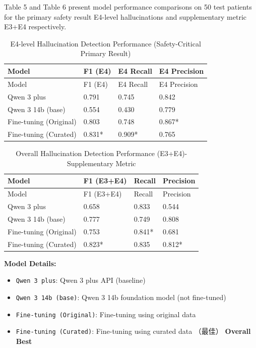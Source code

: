 \documentclass[11pt]{article}
\begin{document}
Table 5 and Table 6 present model performance comparisons on 50 test patients for the primary safety result E4-level hallucinations and supplementary metric E3+E4 respectively.

\begin{longtable}[]{@{}llll@{}}
\caption{E4-level Hallucination Detection Performance (Safety-Critical Primary Result)}\tabularnewline
\toprule\noalign{}
Model & F1 (E4) & E4 Recall & E4 Precision \\
\midrule\noalign{}
\endfirsthead
\toprule\noalign{}
Model & F1 (E4) & E4 Recall & E4 Precision \\
\midrule\noalign{}
\endhead
\bottomrule\noalign{}
\endlastfoot
Qwen 3 plus & 0.791 & 0.745 & 0.842 \\
Qwen 3 14b (base) & 0.554 & 0.430 & 0.779 \\
Fine-tuning (Original) & 0.803 & 0.748 & 0.867* \\
Fine-tuning (Curated) & 0.831* & 0.909* & 0.765 \\
\end{longtable}

\begin{longtable}[]{@{}llll@{}}
\caption{Overall Hallucination Detection Performance (E3+E4)-Supplementary Metric}\tabularnewline
\toprule\noalign{}
Model & F1 (E3+E4) & Recall & Precision \\
\midrule\noalign{}
\endfirsthead
\toprule\noalign{}
Model & F1 (E3+E4) & Recall & Precision \\
\midrule\noalign{}
\endhead
\bottomrule\noalign{}
\endlastfoot
Qwen 3 plus & 0.658 & 0.833 & 0.544 \\
Qwen 3 14b (base) & 0.777 & 0.749 & 0.808 \\
Fine-tuning (Original) & 0.753 & 0.841* & 0.681 \\
Fine-tuning (Curated) & 0.823* & 0.835 & 0.812* \\
\end{longtable}

\textbf{Model Details:}

\begin{itemize}
\item
  \texttt{Qwen\ 3\ plus}: Qwen 3 plus API (baseline)
\item
  \texttt{Qwen\ 3\ 14b\ (base)}: Qwen 3 14b foundation model (not fine-tuned)
\item
  \texttt{Fine-tuning\ (Original)}: Fine-tuning using original data
\item
  \texttt{Fine-tuning\ (Curated)}: Fine-tuning using curated data （最佳） \textbf{Overall Best}
\end{itemize}
\end{document}
